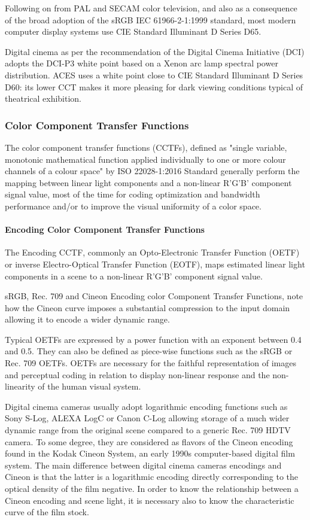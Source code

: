 Following on from PAL and SECAM color television, and also as a consequence of the broad adoption of the sRGB IEC 61966-2-1:1999 standard, most modern computer display systems use CIE Standard Illuminant D Series D65.

Digital cinema as per the recommendation of the Digital Cinema Initiative (DCI) adopts the DCI-P3 white point based on a Xenon arc lamp spectral power distribution. ACES uses a white point close to CIE Standard Illuminant D Series D60: its lower CCT makes it more pleasing for dark viewing conditions typical of theatrical exhibition.

\subsubsection{Color Component Transfer Functions}
The color component transfer functions (CCTFs), defined as "single variable, monotonic mathematical function applied individually to one or more colour channels of a colour space" by  ISO 22028-1:2016 Standard generally perform the mapping between linear light components and a non-linear R'G'B' component signal value, most of the time for coding optimization and bandwidth performance and/or to improve the visual uniformity of a color space.

\paragraph{Encoding Color Component Transfer Functions}

The Encoding CCTF, commonly an Opto-Electronic Transfer Function (OETF) or inverse Electro-Optical Transfer Function (EOTF), maps estimated linear light components in a scene to a non-linear R'G'B' component signal value.

sRGB, Rec. 709 and Cineon Encoding color Component Transfer Functions, note how the Cineon curve imposes a substantial compression to the input domain allowing it to encode a wider dynamic range.

Typical OETFs are expressed by a power function with an exponent between 0.4 and 0.5. They can also be defined as piece-wise functions such as the sRGB or Rec. 709 OETFs. OETFs are necessary for the faithful representation of images and perceptual coding in relation to display non-linear response and the non-linearity of the human visual system.

Digital cinema cameras usually adopt logarithmic encoding functions such as Sony S-Log, ALEXA LogC or Canon C-Log allowing storage of a much wider dynamic range from the original scene compared to a generic Rec. 709 HDTV camera. To some degree, they are considered as flavors of the Cineon encoding found in the Kodak Cineon System, an early 1990s computer-based digital film system. The main difference between digital cinema cameras encodings and Cineon is that the latter is a logarithmic encoding directly corresponding to the optical density of the film negative. In order to know the relationship between a Cineon encoding and scene light, it is necessary also to know the characteristic curve of the film stock.


